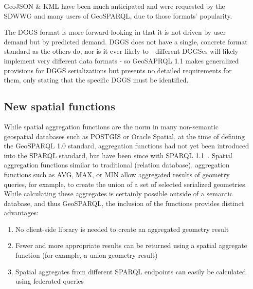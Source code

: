 \documentclass[runningheads]{llncs}
\begin{document}
GeoJSON \& KML have been much anticipated and were requested by the SDWWG and many users of 
GeoSPARQL, due to those formats' popularity.

The DGGS format is more forward-looking in that it is not driven by user demand but by predicted demand.
DGGS does not have a single, concrete format standard as the others do, nor is it ever likely to - different DGGSes will 
likely implement very different data formats - so GeoSAPRQL 1.1 makes generalized provisions for DGGS serializations but 
presents no detailed requirements for them, only stating that the specific DGGS must be identified.

\subsection{New spatial functions}\label{sec:newfunctions}
While spatial aggregation functions are the norm in many non-semantic geospatial databases such as POSTGIS or Oracle Spatial, 
at the time of defining the GeoSPARQL 1.0 standard, aggregation functions had not yet been introduced into the SPARQL standard,
but have been since with SPARQL 1.1~\cite{w3c_sparql_working_group_sparql_2013}. Spatial aggregation functions 
similar to traditional (relation database), aggregation functions such as AVG, MAX, or MIN allow aggregated results of geometry 
queries, for example, to create the union of a set of selected serialized geometries. While calculating these aggregates is 
certainly possible outside of a semantic database, and thus GeoSPARQL, the inclusion of the functions provides distinct advantages:

\begin{enumerate}
    \item No client-side library is needed to create an aggregated geometry result
    \item Fewer and more appropriate results can be returned using a spatial aggregate function (for example, a union geometry result)
    \item Spatial aggregates from different SPARQL endpoints can easily be calculated using federated queries 
\end{enumerate}
\end{document}

